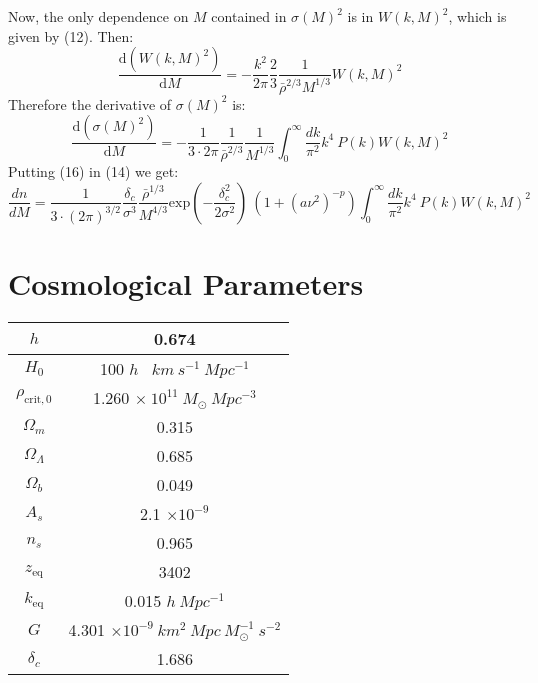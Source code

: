 \documentclass{article}
\begin{document}
Now, the only dependence on $M$ contained in $\sigma(M)^2$ is in $W(k,M)^2$, which is given by (12). Then:
\begin{equation}
    \frac{\text{d}(W(k,M)^2)}{\text{d}M} = -\frac{k^2}{2\pi}\frac{2}{3}\frac{1}{\bar{\rho}^{2/3}M^{1/3}}W(k,M)^2
\end{equation}
Therefore the derivative of $\sigma(M)^2$ is:
\begin{equation}
    \frac{\text{d}(\sigma(M)^2)}{\text{d}M} = -\frac{1}{3\cdot 2\pi}\frac{1}{\bar{\rho}^{2/3}}\frac{1}{M^{1/3}}\int_0^\infty \frac{dk}{\pi^2} k^4 \ P(k) W(k,M)^2
\end{equation}
Putting (16) in (14) we get:
\begin{equation}
    \frac{dn}{dM}=\frac{1}{3\cdot (2\pi)^{3/2}}\frac{\delta_c}{\sigma^3}\frac{\bar{\rho}^{1/3}}{M^{4/3}}\text{exp}\left(-\frac{\delta_c^2}{2\sigma^2}\right) \ (1+(a\nu^2)^{-p})\int_0^\infty \frac{dk}{\pi^2} k^4 \ P(k) W(k,M)^2
\end{equation}
\newpage
\section{Cosmological Parameters}

\begin{center}
\begin{tabular}{ |c|c| } 
  \hline
   $h$ & 0.674 \\ 
  \hline
   $H_0$ & 100 $h$ \ $km  \ s^{-1} \ Mpc^{-1}$\\ 
  \hline
   $\rho_{\text{crit},0}$ & 1.260 $\times \ 10^{11} \ M_\odot \ Mpc^{-3}$   \\ 
  \hline
  $\Omega_m$ & 0.315 \\
  \hline
  $\Omega_\Lambda$ & 0.685 \\
  \hline
  $\Omega_b$ & 0.049 \\
  \hline
  $A_s$ & 2.1 $\times 10^{-9}$ \\
  \hline
  $n_s$ & 0.965 \\
  \hline
  $z_{\text{eq}}$ & 3402 \\
  \hline
  $k_{\text{eq}}$ & 0.015 $h \ Mpc^{-1} $ \\
  \hline 
  $G$ & 4.301 $\times 10^{-9} \ km^2 \ Mpc \ M_\odot^{-1} \ s^{-2} $ \\
  \hline
  $\delta_c$ & 1.686 \\
  \hline 
\end{tabular}
\end{center}

\newpage
\end{document}
